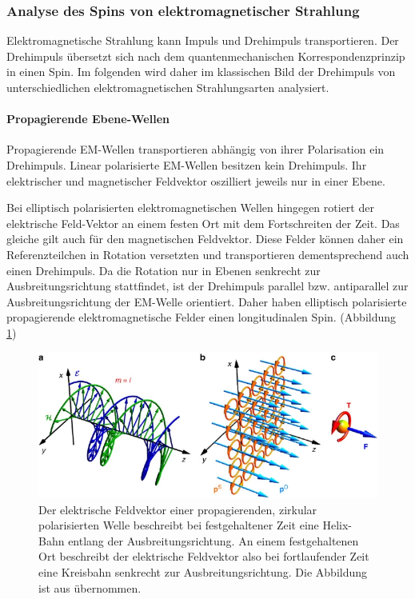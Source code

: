 \documentclass[titlepage,  ngerman]{article}
\begin{document}
	
	
	\subsubsection{Analyse des Spins von elektromagnetischer Strahlung}
	\label{sec:spin_spp}
	Elektromagnetische Strahlung kann Impuls und Drehimpuls transportieren. Der Drehimpuls übersetzt sich nach dem quantenmechanischen Korrespondenzprinzip in einen Spin. Im folgenden wird daher im klassischen Bild der Drehimpuls von unterschiedlichen elektromagnetischen Strahlungsarten analysiert.
	\paragraph{Propagierende Ebene-Wellen}
	Propagierende EM-Wellen transportieren abhängig von ihrer Polarisation ein Drehimpuls. Linear polarisierte EM-Wellen besitzen kein Drehimpuls. Ihr elektrischer und magnetischer Feldvektor oszilliert jeweils nur in einer Ebene.
	
	Bei elliptisch polarisierten elektromagnetischen Wellen hingegen rotiert der elektrische Feld-Vektor an einem festen Ort mit dem Fortschreiten der Zeit. Das gleiche gilt auch für den magnetischen Feldvektor. Diese Felder können daher ein Referenzteilchen in Rotation versetzten und transportieren dementsprechend auch einen Drehimpuls. Da die Rotation nur in Ebenen senkrecht zur Ausbreitungsrichtung stattfindet, ist der Drehimpuls parallel bzw. antiparallel zur Ausbreitungsrichtung der EM-Welle orientiert. Daher haben elliptisch polarisierte propagierende elektromagnetische Felder einen longitudinalen Spin. (Abbildung \ref{fig:prop_spin})
	
	\begin{figure}[h]
		\centering
		\includegraphics[width=0.7\linewidth]{figures/spin/prop_spin}
		\caption[Spin propagierende EM-Welle]{Der elektrische Feldvektor einer propagierenden, zirkular polarisierten Welle beschreibt bei festgehaltener Zeit eine Helix-Bahn entlang der Ausbreitungsrichtung. An einem festgehaltenen Ort beschreibt der elektrische Feldvektor also bei fortlaufender Zeit eine Kreisbahn senkrecht zur Ausbreitungsrichtung. Die Abbildung ist aus \cite{Bliokh.2014} übernommen.}
		\label{fig:prop_spin}
	\end{figure}
	
\end{document}
